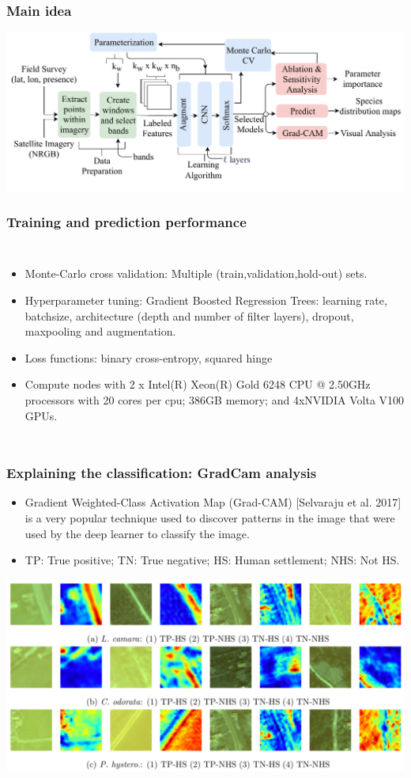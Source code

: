 \documentclass[xcolor=table,xcolor=dvipsnames]{beamer}
\begin{document}
\begin{frame}
\frametitle{Main idea} 
{
\centering
\includegraphics[width=\textwidth]{figs/full_architecture.pdf}
}
\end{frame}
\begin{frame}
\frametitle{Training and prediction performance}
\begin{columns}[c]
\begin{itemize}
\item Monte-Carlo cross validation: Multiple (train,validation,hold-out) sets.
\item Hyperparameter tuning: Gradient Boosted Regression Trees: learning rate, batchsize, architecture (depth and number of filter layers), dropout, maxpooling and augmentation.
\item Loss functions: binary cross-entropy, squared hinge
\item Compute nodes with 2 x Intel(R) Xeon(R) Gold 6248 CPU @ 2.50GHz processors with 20 cores per cpu; 386GB memory; and 4xNVIDIA Volta V100 GPUs.
\end{itemize}

\end{columns}
\end{frame}
\begin{frame}
\frametitle{Explaining the classification: GradCam analysis} 
\begin{itemize}
    \item Gradient Weighted-Class Activation Map (Grad-CAM) [Selvaraju et al. 2017] is a very popular technique used to discover patterns in the image that were used by the deep learner to classify the image.
    \item TP: True positive; TN: True negative; HS: Human settlement; NHS: Not HS.
\end{itemize}
\centering
\includegraphics[width=.9\textwidth]{figs/gradcam.png}
\end{frame}
\end{document}
